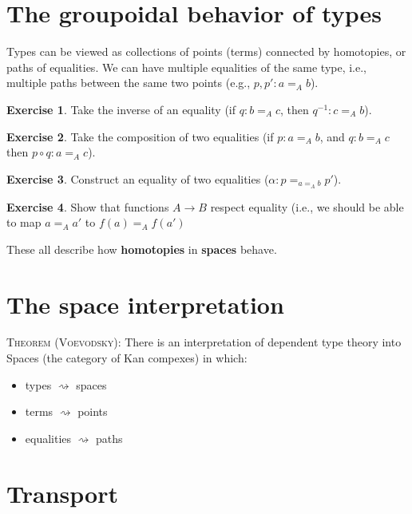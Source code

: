 \documentclass{amsart}
\theoremstyle{definition}
\newtheorem{ex}{Exercise}[section]
\begin{document}
\section{The groupoidal behavior of types}
Types can be viewed as collections of points (terms) connected by homotopies, or paths of equalities.
We can have multiple equalities of the same type, i.e., multiple paths between the same two points (e.g., $p, p' : a \mathbf{=}_A b$).

\begin{ex}
    Take the inverse of an equality (if 
    $q : b \mathbf{=}_A c$, then $q^{-1} : c \mathbf{=}_A b$).
\end{ex}

\begin{ex}
    Take the composition of two equalities (if 
    $p : a \mathbf{=}_A b$, and $q : b \mathbf{=}_A c$ then $p \circ q : a \mathbf{=}_A c$).
\end{ex}

\begin{ex}
    Construct an equality of two equalities ($\alpha : p \mathbf{=}_{a \mathbf{=}_A b} p'$).
\end{ex}

\begin{ex}
    Show that functions $A \rightarrow B$ respect equality (i.e., we should be able to map $a \mathbf{=}_A a'$ to $f(a) \mathbf{=}_A f(a')$
\end{ex}

These all describe how \textbf{homotopies} in \textbf{spaces} behave.

\section{The space interpretation}

\textsc{Theorem (Voevodsky):} There is an interpretation of dependent type theory into Spaces (the category of Kan compexes) in which:
\begin{itemize}
\item[1.] types $\rightsquigarrow$ spaces
\item[2.] terms $\rightsquigarrow$ points
\item[3.] equalities $\rightsquigarrow$ paths
\end{itemize}

\section{Transport}
\end{document}
